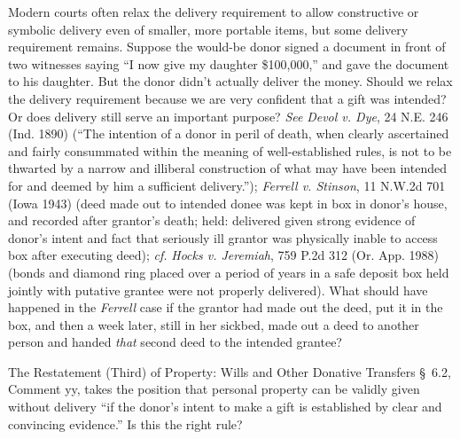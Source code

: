 \item Modern courts often relax the delivery requirement to allow constructive
or symbolic delivery even of smaller, more portable items, but some delivery
requirement remains.  Suppose the would-be donor signed a document in front of
two witnesses saying ``I now give my daughter \$100,000,'' and gave the
document to his daughter.  But the donor didn't actually deliver the money. 
Should we relax the delivery requirement because we are very confident that a
gift was intended?  Or does delivery still serve an important purpose?
\emph{See} \emph{Devol v. Dye}, 24 N.E. 246 (Ind. 1890) (``The intention of a
donor in peril of
death, when clearly ascertained and fairly consummated within the meaning of
well-established rules, is not to be thwarted by a narrow and illiberal
construction of what may have been intended for and deemed by him a sufficient
delivery.''); \emph{Ferrell v. Stinson}, 11 N.W.2d 701 (Iowa 1943) (deed made
out to
intended donee was kept in box in donor's house, and recorded after grantor's
death; held: delivered given strong evidence of donor's intent and fact that
seriously ill grantor was physically inable to access box after executing
deed); \textit{cf.} \emph{Hocks v. Jeremiah}, 759 P.2d 312 (Or. App. 1988)
(bonds and
diamond ring placed over a period of years in a safe deposit box held jointly
with putative grantee were not properly delivered).  What should have happened
in the \textit{Ferrell} case if the grantor had made out the deed, put it in
the box, and then a week later, still in her sickbed, made out a deed to
another person and handed \textit{that} second deed to the intended grantee?  


\item The Restatement (Third) of Property: Wills and Other Donative Transfers
\S~6.2, Comment yy, takes the position that personal property can be validly
given without delivery ``if the donor's intent to make a gift is established by
clear and convincing evidence.''  Is this the right rule?

